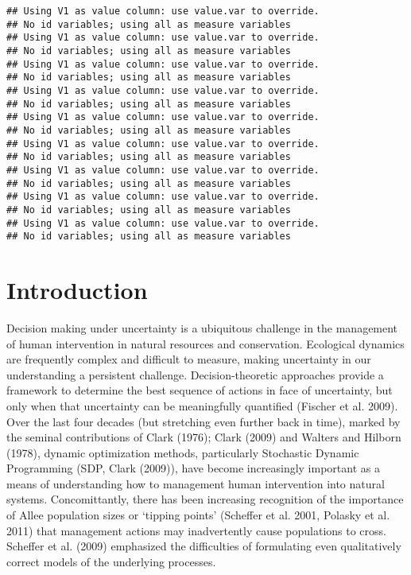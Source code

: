 \documentclass[]{components/elsarticle}
\begin{document}
\begin{verbatim}
## Using V1 as value column: use value.var to override.
## No id variables; using all as measure variables
## Using V1 as value column: use value.var to override.
## No id variables; using all as measure variables
## Using V1 as value column: use value.var to override.
## No id variables; using all as measure variables
## Using V1 as value column: use value.var to override.
## No id variables; using all as measure variables
## Using V1 as value column: use value.var to override.
## No id variables; using all as measure variables
## Using V1 as value column: use value.var to override.
## No id variables; using all as measure variables
## Using V1 as value column: use value.var to override.
## No id variables; using all as measure variables
## Using V1 as value column: use value.var to override.
## No id variables; using all as measure variables
## Using V1 as value column: use value.var to override.
## No id variables; using all as measure variables
\end{verbatim}

\section{Introduction}\label{introduction}

Decision making under uncertainty is a ubiquitous challenge in the
management of human intervention in natural resources and conservation.
Ecological dynamics are frequently complex and difficult to measure,
making uncertainty in our understanding a persistent challenge.
Decision-theoretic approaches provide a framework to determine the best
sequence of actions in face of uncertainty, but only when that
uncertainty can be meaningfully quantified (Fischer et al. 2009). Over
the last four decades (but stretching even further back in time), marked
by the seminal contributions of Clark (1976); Clark (2009) and Walters
and Hilborn (1978), dynamic optimization methods, particularly
Stochastic Dynamic Programming (SDP, Clark (2009)), have become
increasingly important as a means of understanding how to management
human intervention into natural systems. Concomittantly, there has been
increasing recognition of the importance of Allee population sizes or
`tipping points' (Scheffer et al. 2001, Polasky et al. 2011) that
management actions may inadvertently cause populations to cross.
Scheffer et al. (2009) emphasized the difficulties of formulating even
qualitatively correct models of the underlying processes.
\end{document}
